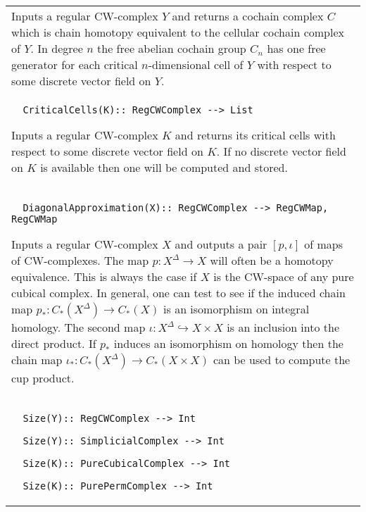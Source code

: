 \documentclass[a4paper,11pt]{report}
\begin{document}
{\begin{center}
\begin{tabular}{|l|}
 Inputs a regular CW-complex $Y$ and returns a cochain complex $C$ which is chain homotopy equivalent to the cellular cochain complex of $Y$. In degree $n$ the free abelian cochain group $C_n$ has one free generator for each critical $n$-dimensional cell of $Y$ with respect to some discrete vector field on $Y$. \\
 \index{CriticalCells} 
\begin{verbatim}  CriticalCells(K):: RegCWComplex --> List
\end{verbatim}


 

 Inputs a regular CW-complex $K$ and returns its critical cells with respect to some discrete vector field on $K$. If no discrete vector field on $K$ is available then one will be computed and stored. \\
 \index{DiagonalApproximation} 
\begin{verbatim}  DiagonalApproximation(X):: RegCWComplex --> RegCWMap, RegCWMap
\end{verbatim}


 

 Inputs a regular CW-complex $X$ and outputs a pair $[p,\iota]$ of maps of CW-complexes. The map $p\colon X^\Delta \rightarrow X$ will often be a homotopy equivalence. This is always the case if $X$ is the CW-space of any pure cubical complex. In general, one can test to see
if the induced chain map $p_\ast \colon C_\ast(X^\Delta) \rightarrow C_\ast(X)$ is an isomorphism on integral homology. The second map $\iota \colon X^\Delta \hookrightarrow X\times X$ is an inclusion into the direct product. If $p_\ast$ induces an isomorphism on homology then the chain map $\iota_\ast\colon C_\ast(X^\Delta) \rightarrow C_\ast(X\times X)$ can be used to compute the cup product. \\
 \index{Size} 
\begin{verbatim}  Size(Y):: RegCWComplex --> Int
\end{verbatim}
 
\begin{verbatim}  Size(Y):: SimplicialComplex --> Int
\end{verbatim}
 
\begin{verbatim}  Size(K):: PureCubicalComplex --> Int
\end{verbatim}
 
\begin{verbatim}  Size(K):: PurePermComplex --> Int
\end{verbatim}



\end{tabular}
\end{center}}
\end{document}
